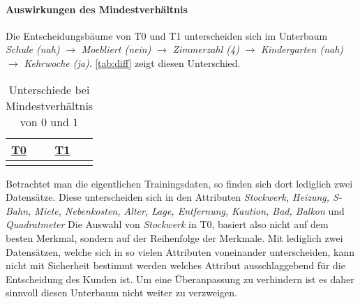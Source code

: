 \paragraph{Auswirkungen des Mindestverhältnis}
Die Entscheidungsbäume von T0 und T1 unterscheiden sich im Unterbaum
\emph{Schule (nah)} $\rightarrow$ \emph{Moebliert (nein)} $\rightarrow$ \emph{Zimmerzahl (4)} $\rightarrow$ \emph{Kindergarten (nah)} $\rightarrow$ \emph{Kehrwoche (ja)}.
\autoref{tab:diff} zeigt diesen Unterschied.

\useunder{\uline}{\ul}{}
\begin{table}[h]
    \begin{center}
        \begin{tabular}{|p{6cm}|p{6cm}|}
        \hline
            {\ul \textbf{T0}}   & {\ul \textbf{T1}} \\
            \hline
            {}
            &
            {}
            \\
            \hline
        \end{tabular}
        \caption{Unterschiede bei Mindestverhältnis von $0$ und $1$}
        \label{tab:diff}
    \end{center}
\end{table}

Betrachtet man die eigentlichen Trainingsdaten, so finden sich dort lediglich zwei Datensätze.
Diese unterscheiden sich in den Attributen \emph{Stockwerk, Heizung, S-Bahn, Miete, Nebenkosten, Alter, Lage, Entfernung, Kaution, Bad, Balkon} und \emph{Quadratmeter}
Die Auswahl von \emph{Stockwerk} in T0, basiert also nicht auf dem besten Merkmal,
 sondern auf der Reihenfolge der Merkmale.
Mit lediglich zwei Datensätzen, welche sich in so vielen Attributen voneinander unterscheiden,
kann nicht mit Sicherheit bestimmt werden welches Attribut ausschlaggebend für die Entscheidung des Kunden ist.
Um eine Überanpassung zu verhindern ist es daher sinnvoll diesen Unterbaum nicht weiter zu verzweigen.


